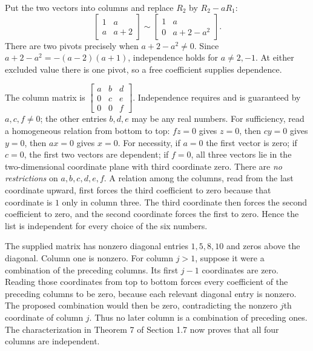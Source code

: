 Put the two vectors into columns and replace $R_2$ by $R_2-aR_1$:
\[
 \begin{bmatrix}1&a\\a&a+2\end{bmatrix}
 \sim\begin{bmatrix}1&a\\0&a+2-a^2\end{bmatrix}.
\]
There are two pivots precisely when $a+2-a^2\ne0$.
Since $a+2-a^2=-(a-2)(a+1)$, independence holds for
$\boxed{a\ne2,-1}$. At either excluded value there is one pivot,
so a free coefficient supplies dependence.

The column matrix is $\begin{bmatrix}a&b&d\\0&c&e\\0&0&f\end{bmatrix}$.
Independence requires and is guaranteed by $a,c,f\ne0$; the other
entries $b,d,e$ may be any real numbers. For sufficiency, read a
homogeneous relation from bottom to top: $fz=0$ gives $z=0$,
then $cy=0$ gives $y=0$, then $ax=0$ gives $x=0$.
For necessity, if $a=0$ the first vector is zero; if $c=0$, the
first two vectors are dependent; if $f=0$, all three vectors lie in
the two-dimensional coordinate plane with third coordinate zero.
There are \emph{no restrictions} on $a,b,c,d,e,f$.
A relation among the columns, read from the last coordinate upward,
first forces the third coefficient to zero because that coordinate
is $1$ only in column three. The third coordinate then forces the
second coefficient to zero, and the second coordinate forces the
first to zero. Hence the list is independent for every choice of the six numbers.

The supplied matrix has nonzero diagonal entries $1,5,8,10$
and zeros above the diagonal. Column one is nonzero. For column
$j>1$, suppose it were a combination of the preceding columns.
Its first $j-1$ coordinates are zero. Reading those coordinates
from top to bottom forces every coefficient of the preceding columns
to be zero, because each relevant diagonal entry is nonzero.
The proposed combination would then be zero, contradicting the nonzero
$j$th coordinate of column $j$. Thus no later column is a combination
of preceding ones. The characterization in Theorem 7 of Section 1.7
now proves that all four columns are independent.


